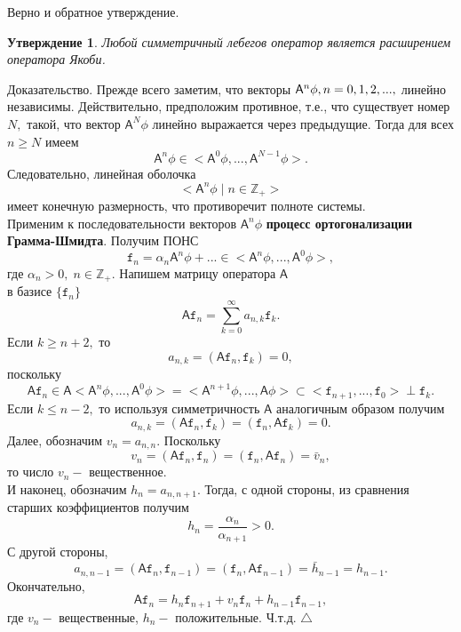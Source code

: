 \documentclass[12pt,a4paper]{article}
\theoremstyle{plain}   \newtheorem{Pro}{Задача}
\newtheorem{Sta}{Утверждение}
\begin{document}
Верно и обратное утверждение.
\begin{Sta}
Любой симметричный лебегов оператор является расширением
оператора Якоби.
\end{Sta}
{\Large Доказательство.}
Прежде всего заметим, что векторы
$ \mathsf{A}^n \phi , \\
n=0,1,2,..., $
линейно независимы. Действительно, предположим противное, т.е.,
что существует номер
$ N , $
такой, что вектор
$ \mathsf{A}^N \phi $
линейно выражается через предыдущие. Тогда для всех
$ n \geq N $
имеем
$$
  \mathsf{A}^n \phi \in <\mathsf{A}^0 \phi ,..., \mathsf{A}^{N-1}
  \phi >.
$$
Следовательно, линейная оболочка
$$
  <\mathsf{A}^n \phi \; | \; n \in \mathbb{Z}_+ >
$$
имеет конечную размерность, что противоречит полноте системы.\\
Применим к последовательности векторов
$ \mathsf{A}^n \phi $
{\bfseries процесс ортогонализации Грамма-Шмидта}.
Получим ПОНС
$$
  \mathtt{f}_n =\alpha _n \mathsf{A}^n \phi +...
  \in <\mathsf{A}^n \phi ,..., \mathsf{A}^0 \phi >,
$$
где
$ \alpha _n >0, \; n \in \mathbb{Z}_+ .  $
Напишем матрицу оператора
$ \mathsf{A} $\\
в базисе
$ \{ \mathtt{f}_n \} $
$$
  \mathsf{A}\mathtt{f}_n = \sum _{k=0}^{\infty}
  a_{n,k}\mathtt{f}_k .
$$
Если
$ k \geq n+2, $
то
$$
  a_{n,k}=(\mathsf{A}\mathtt{f}_n ,\mathtt{f}_k )=0,
$$
поскольку
$$
  \mathsf{A}\mathtt{f}_n \in \mathsf{A}
  <\mathsf{A}^n \phi ,..., \mathsf{A}^0 \phi >
  = <\mathsf{A}^{n+1} \phi ,..., \mathsf{A} \phi >
  \subset <\mathtt{f}_{n+1},...,\mathtt{f}_0 > \perp
  \mathtt{f}_k .
$$
Если
$ k \leq n-2 , $
то используя симметричность
$ \mathsf{A} $
аналогичным образом получим
$$
  a_{n,k}=(\mathsf{A}\mathtt{f}_n , \mathtt{f}_k )=
  (\mathtt{f}_n , \mathsf{A}\mathtt{f}_k )=0.
$$
Далее, обозначим
$ v_n =a_{n,n} . $
Поскольку
$$
  v_n =(\mathsf{A}\mathtt{f}_n , \mathtt{f}_n )=
  (\mathtt{f}_n , \mathsf{A}\mathtt{f}_n ) =
  \bar v_n ,
$$
то число
$ v_n - $
вещественное.
\\
И наконец, обозначим
$ h_n =a_{n,n+1} . $
Тогда, с одной стороны, из сравнения старших коэффициентов
получим
$$
  h_n =\frac{\alpha _n}{\alpha _{n+1}}>0.
$$
С другой стороны,
$$
  a_{n,n-1}=(\mathsf{A}\mathtt{f}_n , \mathtt{f}_{n-1})=
  (\mathtt{f}_n , \mathsf{A}\mathtt{f}_{n-1})=
  \bar h_{n-1}=h_{n-1}.
$$
Окончательно,
$$
  \mathsf{A}\mathtt{f}_n =
  h_n \mathtt{f}_{n+1}+v_n \mathtt{f}_n +h_{n-1}\mathtt{f}_{n-1} ,
$$
где
$ v_n - $
вещественные,
$ h_n - $
положительные. Ч.т.д.
$ \triangle $
\newpage
\end{document}

